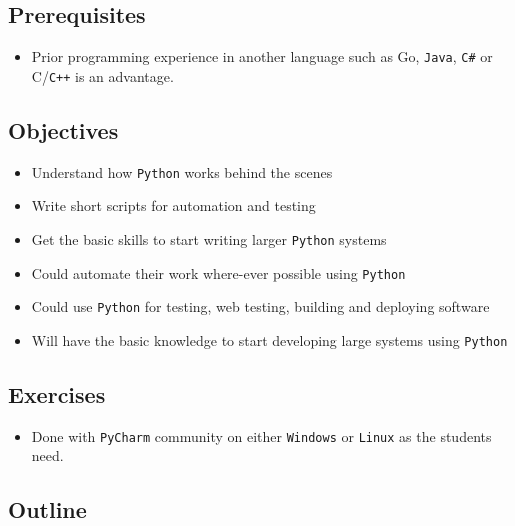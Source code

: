 \documentclass[
]{article}
\providecommand{\tightlist}{%
  \setlength{\itemsep}{0pt}\setlength{\parskip}{0pt}}
\begin{document}
\subsection{Prerequisites}\label{prerequisites}

\begin{itemize}
\tightlist
\item
  Prior programming experience in another language such as Go,
  \texttt{Java}, \texttt{C\#} or C/\texttt{C++} is an advantage.
\end{itemize}

\subsection{Objectives}\label{objectives}

\begin{itemize}
\tightlist
\item
  Understand how \texttt{Python} works behind the scenes
\item
  Write short scripts for automation and testing
\item
  Get the basic skills to start writing larger \texttt{Python} systems
\item
  Could automate their work where-ever possible using \texttt{Python}
\item
  Could use \texttt{Python} for testing, web testing, building and
  deploying software
\item
  Will have the basic knowledge to start developing large systems using
  \texttt{Python}
\end{itemize}

\subsection{Exercises}\label{exercises}

\begin{itemize}
\tightlist
\item
  Done with \texttt{PyCharm} community on either \texttt{Windows} or
  \texttt{Linux} as the students need.
\end{itemize}

\subsection{Outline}\label{outline}
\end{document}
